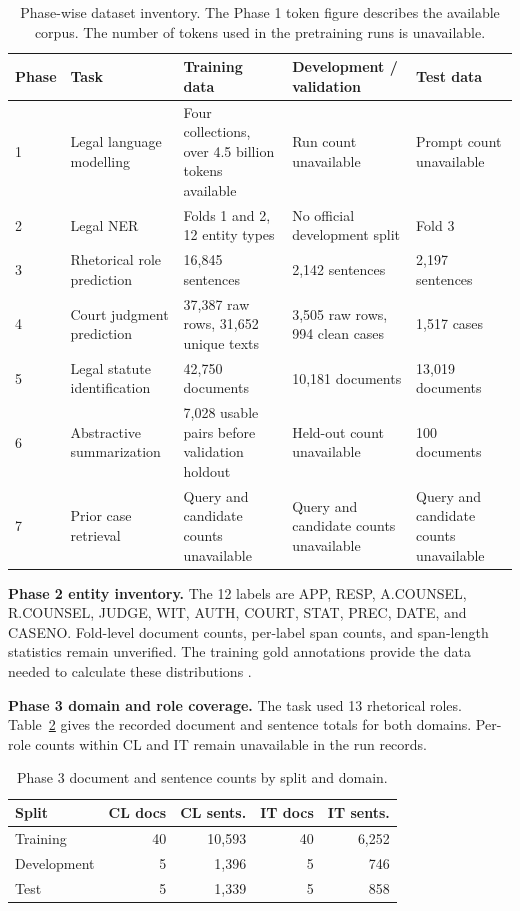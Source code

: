 \begin{table}[t]
\centering
\footnotesize
\caption{Phase-wise dataset inventory. The Phase 1 token figure describes the available corpus. The number of tokens used in the pretraining runs is unavailable.}
\label{tab:split-inventory}
\begin{tabularx}{\linewidth}{@{}lXXXX@{}}
\toprule
\textbf{Phase} & \textbf{Task} & \textbf{Training data} & \textbf{Development / validation} & \textbf{Test data} \\
\midrule
1 & Legal language modelling & Four collections, over 4.5 billion tokens available & Run count unavailable & Prompt count unavailable \\
2 & Legal NER & Folds 1 and 2, 12 entity types & No official development split & Fold 3 \\
3 & Rhetorical role prediction & 16,845 sentences & 2,142 sentences & 2,197 sentences \\
4 & Court judgment prediction & 37,387 raw rows, 31,652 unique texts & 3,505 raw rows, 994 clean cases & 1,517 cases \\
5 & Legal statute identification & 42,750 documents & 10,181 documents & 13,019 documents \\
6 & Abstractive summarization & 7,028 usable pairs before validation holdout & Held-out count unavailable & 100 documents \\
7 & Prior case retrieval & Query and candidate counts unavailable & Query and candidate counts unavailable & Query and candidate counts unavailable \\
\bottomrule
\end{tabularx}
\end{table}

\textbf{Phase 2 entity inventory.} The 12 labels are APP, RESP,
A.COUNSEL, R.COUNSEL, JUDGE, WIT, AUTH, COURT, STAT, PREC, DATE, and
CASENO. Fold-level document counts, per-label span counts, and
span-length statistics remain unverified. The training gold annotations
provide the data needed to calculate these distributions
\cite{cs781_brief}.

\textbf{Phase 3 domain and role coverage.} The task used 13 rhetorical
roles. Table~\ref{tab:rr-domains} gives the recorded
document and sentence totals for both domains. Per-role counts within CL
and IT remain unavailable in the run records.

\begin{table}[t]
\centering
\footnotesize
\caption{Phase 3 document and sentence counts by split and domain.}
\label{tab:rr-domains}
\begin{tabularx}{\linewidth}{@{}Xrrrr@{}}
\toprule
\textbf{Split} & \textbf{CL docs} & \textbf{CL sents.} & \textbf{IT docs} & \textbf{IT sents.} \\
\midrule
Training & 40 & 10,593 & 40 & 6,252 \\
Development & 5 & 1,396 & 5 & 746 \\
Test & 5 & 1,339 & 5 & 858 \\
\bottomrule
\end{tabularx}
\end{table}

